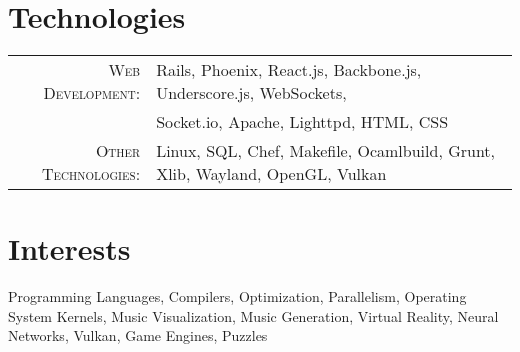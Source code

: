 \documentclass[a4paper,10pt]{article}
\begin{document}
\section{Technologies}
\begin{tabular}{rl}
  \textsc{Web Development:}    & Rails, Phoenix, React.js, Backbone.js, Underscore.js, WebSockets,\\
                               & Socket.io, Apache, Lighttpd, HTML, CSS\\
  \textsc{Other Technologies:} & Linux, SQL, Chef, Makefile, Ocamlbuild, Grunt, Xlib, Wayland, OpenGL, Vulkan\\
\end{tabular}


\section{Interests}
Programming Languages, Compilers, Optimization, Parallelism, Operating System Kernels, Music Visualization, Music Generation, Virtual Reality, Neural Networks, Vulkan, Game Engines, Puzzles\\


\end{document}

